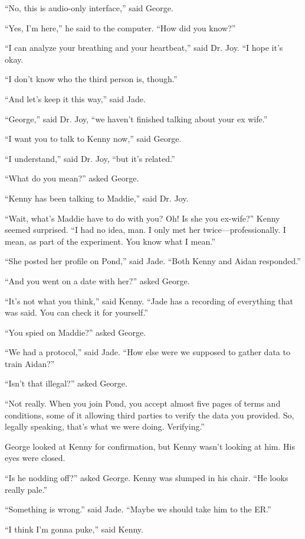 \documentclass{memoir}
\begin{document}
``No, this is audio-only interface,'' said George.

``Yes, I'm here,'' he said to the computer. ``How did you know?''

``I can analyze your breathing and your heartbeat,'' said Dr. Joy. ``I hope it's okay.

``I don't know who the third person is, though.''

``And let's keep it this way,'' said Jade.

``George,'' said Dr. Joy, ``we haven't finished talking about your ex wife.''

``I want you to talk to Kenny now,'' said George.

``I understand,'' said Dr. Joy, ``but it's related.''

``What do you mean?'' asked George.

``Kenny has been talking to Maddie,'' said Dr. Joy.

``Wait, what's Maddie have to do with you? Oh! Is she you ex-wife?'' Kenny seemed surprised. ``I had no idea, man. I only met her twice---professionally. I mean, as part of the experiment. You know what I mean.''

``She posted her profile on Pond,'' said Jade. ``Both Kenny and Aidan responded.''

``And you went on a date with her?'' asked George.

``It's not what you think,'' said Kenny. ``Jade has a recording of everything that was said. You can check it for yourself.''

``You spied on Maddie?'' asked George.

``We had a protocol,'' said Jade. ``How else were we supposed to gather data to train Aidan?''

``Isn't that illegal?'' asked George.

``Not really. When you join Pond, you accept almost five pages of terms and conditions, some of it allowing third parties to verify the data you provided. So, legally speaking, that's what we were doing. Verifying.''

George looked at Kenny for confirmation, but Kenny wasn't looking at him. His eyes were closed.

``Is he nodding off?'' asked George. Kenny was slumped in his chair. ``He looks really pale.''

``Something is wrong.'' said Jade. ``Maybe we should take him to the ER.''

``I think I'm gonna puke,'' said Kenny.
\end{document}
